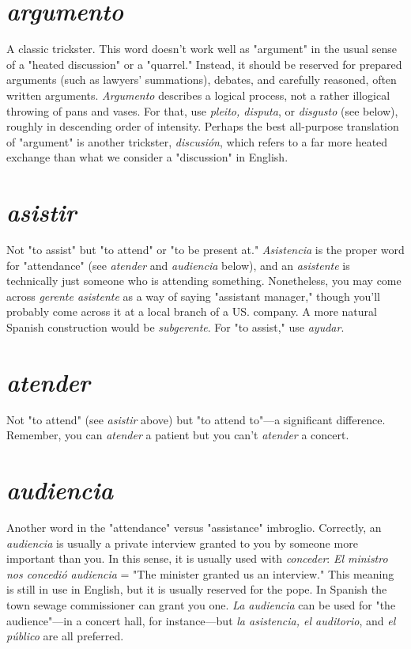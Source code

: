 \documentclass[14pt,a4paper,oneside]{memoir}
\begin{document}
\section{\emph{argumento}}

A classic trickster. This word doesn't work
well as "argument" in the usual sense of a "heated discussion" or a
"quarrel." Instead, it should be reserved for prepared arguments (such
as lawyers' summations), debates, and carefully reasoned, often written
arguments. \emph{Argumento} describes a logical process, not a rather illogical throwing of pans and vases. For that, use \emph{pleito, disputa}, or \emph{disgusto} (see below), roughly in descending order of intensity. Perhaps the
best all-purpose translation of "argument" is another trickster, \emph{discusión}, which refers to a far more heated exchange than what we consider a "discussion" in English.

\section{\emph{asistir}}

Not "to assist" but "to attend" or "to be present at."
\emph{Asistencia} is the proper word for "attendance" (see \emph{atender} and \emph{audiencia} below), and an \emph{asistente} is technically just someone who is attending something. Nonetheless, you may come across \emph{gerente asistente} as a way of saying "assistant manager," though you'll probably
come across it at a local branch of a US. company. A more natural
Spanish construction would be \emph{subgerente}. For "to assist," use \emph{ayudar}.

\section{\emph{atender}}

Not "to attend" (see \emph{asistir} above) but "to attend
to"---a significant difference. Remember, you can \emph{atender} a patient but you can't \emph{atender} a concert.

\section{\emph{audiencia}}

Another word in the "attendance" versus "assistance" imbroglio. Correctly, an \emph{audiencia} is usually a private interview granted to you by someone more important than you. In this
sense, it is usually used with \emph{conceder}: \emph{El ministro nos concedió audiencia} = "The minister granted us an interview." This meaning is
still in use in English, but it is usually reserved for the pope. In Spanish the town sewage commissioner can grant you one. \emph{La audiencia}
can be used for "the audience"---in a concert hall, for instance---but \emph{la
	asistencia, el auditorio}, and \emph{el público} are all preferred.
\end{document}
